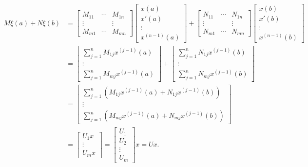 \documentclass[11pt, oneside, a4paper]{article}
\begin{document}
\begin{align*}
    M\xi(a) + N\xi(b) &= \begin{bmatrix}
        M_{11} & \cdots & M_{1n}\\
        \vdots &  & \vdots\\
        M_{m1} & \cdots & M_{mn}
    \end{bmatrix}\begin{bmatrix}x(a)\\ x'(a)\\ \vdots \\ x^{(n-1)}(a)
        \end{bmatrix} + \begin{bmatrix}
            N_{11} & \cdots & N_{1n}\\
            \vdots &  & \vdots\\
            N_{m1} & \cdots & N_{mn}
        \end{bmatrix}\begin{bmatrix}x(b)\\ x'(b)\\ \vdots \\ x^{(n-1)}(b)
        \end{bmatrix}\\
        &= \begin{bmatrix}
            \sum_{j=1}^n M_{1j}x^{(j-1)}(a)\\
            \vdots\\
            \sum_{j=1}^n M_{mj}x^{(j-1)}(a)
        \end{bmatrix} + \begin{bmatrix}
            \sum_{j=1}^n N_{1j}x^{(j-1)}(b)\\
            \vdots\\
            \sum_{j=1}^n N_{mj}x^{(j-1)}(b)
        \end{bmatrix}\\
        &= \begin{bmatrix}
            \sum_{j=1}^n (M_{1j}x^{(j-1)}(a) + N_{1j}x^{(j-1)}(b))\\
            \vdots\\
            \sum_{j=1}^n (M_{mj}x^{(j-1)}(a) + N_{mj}x^{(j-1)}(b))
        \end{bmatrix}\\
        &= \begin{bmatrix}
            U_1 x\\
            \vdots\\
            U_m x
        \end{bmatrix} = \begin{bmatrix}U_1\\ U_2\\ \vdots \\ U_m
        \end{bmatrix}x = Ux.
\end{align*}
\end{document}
